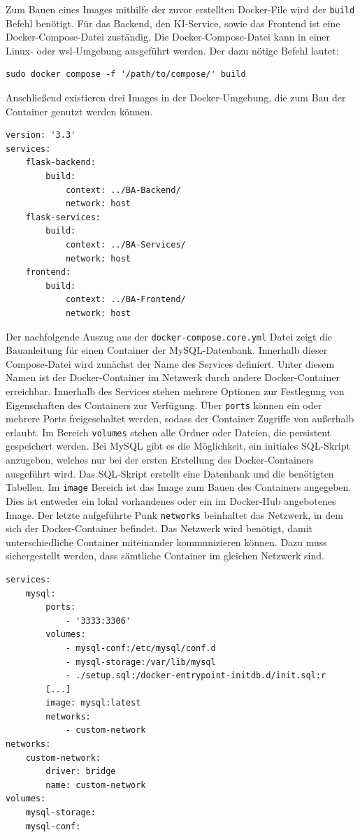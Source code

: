 Zum Bauen eines Images mithilfe der zuvor erstellten Docker-File wird der \texttt{build} Befehl benötigt. Für das Backend, den KI-Service, sowie das Frontend ist eine Docker-Compose-Datei zuständig. Die Docker-Compose-Datei kann in einer Linux- oder \ac{wsl}-Umgebung ausgeführt werden. Der dazu nötige Befehl lautet:
\begin{lstlisting}[caption={Build Befehl zur Erstellung von Docker-Images aus einer Compose-Datei}]
sudo docker compose -f '/path/to/compose/' build
\end{lstlisting}
Anschließend existieren drei Images in der Docker-Umgebung, die zum Bau der Container genutzt werden können. 

\begin{lstlisting}[caption={Docker-Compose-Datei zum Bauen der Docker-Images}]
version: '3.3'
services: 
    flask-backend:
        build: 
            context: ../BA-Backend/
            network: host
    flask-services:
        build:
            context: ../BA-Services/
            network: host
    frontend:
        build:
            context: ../BA-Frontend/
            network: host
\end{lstlisting}

Der nachfolgende Auszug aus der \texttt{docker-compose.core.yml} Datei zeigt die Bauanleitung für einen Container der MySQL-Datenbank. Innerhalb dieser Compose-Datei wird zunächst der Name des Services definiert. Unter diesem Namen ist der Docker-Container im Netzwerk durch andere Docker-Container erreichbar. Innerhalb des Services stehen mehrere Optionen zur Festlegung von Eigenschaften des Containers zur Verfügung. Über \texttt{ports} können ein oder mehrere Ports freigeschaltet werden, sodass der Container Zugriffe von außerhalb erlaubt. Im Bereich \texttt{volumes} stehen alle Ordner oder Dateien, die persistent gespeichert werden. Bei MySQL gibt es die Möglichkeit, ein initiales SQL-Skript anzugeben, welches nur bei der ersten Erstellung des Docker-Containers ausgeführt wird. Das SQL-Skript erstellt eine Datenbank und die benötigten Tabellen. Im \texttt{image} Bereich ist das Image zum Bauen des Containers angegeben. Dies ist entweder ein lokal vorhandenes oder ein im Docker-Hub angebotenes Image. Der letzte aufgeführte Punk \texttt{networks} beinhaltet das Netzwerk, in dem sich der Docker-Container befindet. Das Netzwerk wird benötigt, damit unterschiedliche Container miteinander kommunizieren können. Dazu muss sichergestellt werden, dass sämtliche Container im gleichen Netzwerk sind.

\begin{lstlisting}[caption={Docker-Compose-Datei zum Aufsetzen und Starten der Container}]
services:
    mysql: 
        ports: 
            - '3333:3306'
        volumes: 
            - mysql-conf:/etc/mysql/conf.d
            - mysql-storage:/var/lib/mysql
            - ./setup.sql:/docker-entrypoint-initdb.d/init.sql:r
        [...]
        image: mysql:latest
        networks:
            - custom-network
networks: 
    custom-network:
        driver: bridge
        name: custom-network
volumes:
    mysql-storage:
    mysql-conf:
\end{lstlisting}

